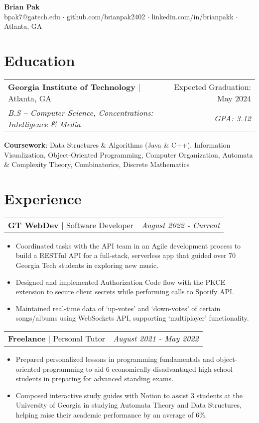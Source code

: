 \documentclass[letterpaper,11pt]{article}
\makeatletter
\newcommand{\resumeEducationHeading}[5]{
    \begin{tabular*}{0.99\textwidth}[t]{l@{\extracolsep{\fill}}r}
      \textbf{#1} $\vert$ #2 & #3 \\
      \textit{\small#4} & \textit{\small #5} \\
    \end{tabular*}\vspace{0.5pt}
}
\newcommand{\resumeExperienceHeading}[3]{
    \begin{tabular*}{0.99\textwidth}[t]{l@{\extracolsep{\fill}}r}
      \textbf{#1} $\vert$ {#2} & \textit{#3} \\
    \end{tabular*}\vspace{-3pt}
}
\newcommand{\resumeItemListStart}{\begin{itemize}[noitemsep]\vspace{-4pt}}
\newcommand{\resumeItemListEnd}{\end{itemize}}
\makeatother
\begin{document}
\begin{center}
  \textbf{\huge Brian Pak} \\
  \vspace*{0.1cm}
  {bpak7@gatech.edu}  $\cdot$ {github.com/brianpak2402} $\cdot$ {linkedin.com/in/brianpakk}  $\cdot$ Atlanta, GA
\end{center}

\section{Education}
    \resumeEducationHeading
      {Georgia Institute of Technology}{Atlanta, GA}{Expected Graduation: May 2024}
      {B.S -- Computer Science, Concentrations: Intelligence \& Media}{GPA: 3.12\vspace{0.1cm}} 
    \textbf{Coursework}{: Data Structures \& Algorithms (Java \& C++), Information Visualization, Object-Oriented Programming, Computer Organization, Automata \& Complexity Theory, Combinatorics, Discrete Mathematics} \\

\section{Experience}
  \resumeExperienceHeading{GT WebDev}{Software Developer}{August 2022 - Current}
    \resumeItemListStart
      \item {Coordinated tasks with the API team in an Agile development process to build a RESTful API for a full-stack, serverless app that guided over 70 Georgia Tech students in exploring new music.}
      \item {Designed and implemented Authorization Code flow with the PKCE extension to secure client secrets while performing calls to Spotify API.}
      \item {Maintained real-time data of `up-votes' and `down-votes' of certain songs/albums using WebSockets API, supporting `multiplayer' functionality.}
    \resumeItemListEnd
  
  \resumeExperienceHeading{Freelance}{Personal Tutor}{August 2021 - May 2022}
    \resumeItemListStart
      \item {Prepared personalized lessons in programming fundamentals and object-oriented programming to aid 6 economically-disadvantaged high school students in preparing for advanced standing exams.}
      \item {Composed interactive study guides with Notion to assist 3 students at the University of Georgia in studying Automata Theory and Data Structures, helping raise their academic performance by an average of 6\%.}
    \resumeItemListEnd
\end{document}

